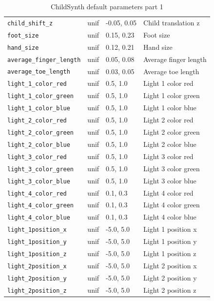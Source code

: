 \documentclass{article}
\begin{document}
\begin{table}[h]
{\begin{tabular}{|l|l|l|l|}
    \texttt{child\_shift\_z} & unif & -0.05, 0.05 & Child translation z\\
    \texttt{foot\_size} & unif & 0.15, 0.23 & Foot size\\
    \texttt{hand\_size} & unif & 0.12, 0.21 & Hand size\\
    \texttt{average\_finger\_length} & unif & 0.05, 0.08 & Average finger length\\
    \texttt{average\_toe\_length} & unif & 0.03, 0.05 & Average toe length\\
    \texttt{light\_1\_color\_red} & unif & 0.5, 1.0 & Light 1 color red\\
    \texttt{light\_1\_color\_green} & unif & 0.5, 1.0 & Light 1 color green\\
    \texttt{light\_1\_color\_blue} & unif & 0.5, 1.0 & Light 1 color blue\\
    \texttt{light\_2\_color\_red} & unif & 0.5, 1.0 & Light 2 color red\\
    \texttt{light\_2\_color\_green} & unif & 0.5, 1.0 & Light 2 color green\\
    \texttt{light\_2\_color\_blue} & unif & 0.5, 1.0 & Light 2 color blue\\
    \texttt{light\_3\_color\_red} & unif & 0.5, 1.0 & Light 3 color red\\
    \texttt{light\_3\_color\_green} & unif & 0.5, 1.0 & Light 3 color green\\
    \texttt{light\_3\_color\_blue} & unif & 0.5, 1.0 & Light 3 color blue\\
    \texttt{light\_4\_color\_red} & unif & 0.1, 0.3 & Light 4 color red\\
    \texttt{light\_4\_color\_green} & unif & 0.1, 0.3 & Light 4 color green\\
    \texttt{light\_4\_color\_blue} & unif & 0.1, 0.3 & Light 4 color blue\\
    \texttt{light\_1position\_x} & unif & -5.0, 5.0 & Light 1 position x\\
    \texttt{light\_1position\_y} & unif & -5.0, 5.0 & Light 1 position y\\
    \texttt{light\_1position\_z} & unif & -5.0, 5.0 & Light 1 position z\\
    \texttt{light\_2position\_x} & unif & -5.0, 5.0 & Light 2 position x\\
    \texttt{light\_2position\_y} & unif & -5.0, 5.0 & Light 2 position y\\
    \texttt{light\_2position\_z} & unif & -5.0, 5.0 & Light 2 position z\\
    \hline
    \end{tabular}
    }
    \caption{ChildSynth default parameters part 1}
    \label{table:defaults}
\end{table}
\end{document}
